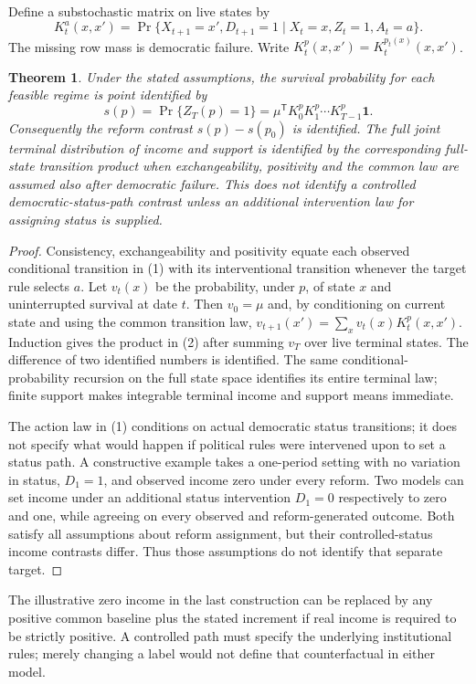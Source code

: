 \documentclass[11pt]{article}
\newtheorem{theorem}{Theorem}
\begin{document}
Define a substochastic matrix on live states by
\[
 K_t^a(x,x')=\Pr\{X_{t+1}=x',D_{t+1}=1\mid
                   X_t=x,Z_t=1,A_t=a\}.                     \tag{1}
\]
The missing row mass is democratic failure. Write
$K_t^p(x,x')=K_t^{p_t(x)}(x,x')$.
\begin{theorem}\label{identification}
Under the stated assumptions, the survival probability for each feasible
regime is point identified by
\[
 s(p)=\Pr\{Z_T(p)=1\}
       =\mu^{\mathsf T}K_0^pK_1^p\cdots K_{T-1}^p\boldsymbol{1}.
                                                                    \tag{2}
\]
Consequently the reform contrast $s(p)-s(p_0)$ is identified. The full
joint terminal distribution of income and support is identified by the
corresponding full-state transition product when exchangeability,
positivity and the common law are assumed also after democratic failure.
This does not identify a controlled democratic-status-path contrast unless
an additional intervention law for assigning status is supplied.
\end{theorem}
\begin{proof}
Consistency, exchangeability and positivity equate each observed
conditional transition in (1) with its interventional transition whenever
the target rule selects $a$. Let $v_t(x)$ be the probability, under $p$,
of state $x$ and uninterrupted survival at date $t$. Then $v_0=\mu$ and,
by conditioning on current state and using the common transition law,
$v_{t+1}(x')=\sum_xv_t(x)K_t^p(x,x')$. Induction gives the product in
(2) after summing $v_T$ over live terminal states. The difference of two
identified numbers is identified. The same conditional-probability
recursion on the full state space identifies its entire terminal law;
finite support makes integrable terminal income and support means immediate.

The action law in (1) conditions on actual democratic status transitions;
it does not specify what would happen if political rules were intervened
upon to set a status path. A constructive example takes a one-period
setting with no variation in status, $D_1=1$, and observed income zero
under every reform. Two models can set income under an additional status
intervention $D_1=0$ respectively to zero and one, while agreeing on every
observed and reform-generated outcome. Both satisfy all assumptions
about reform assignment, but their controlled-status income contrasts
differ. Thus those assumptions do not identify that separate target.
\end{proof}
The illustrative zero income in the last construction can be replaced by
any positive common baseline plus the stated increment if real income is
required to be strictly positive. A controlled path must specify the
underlying institutional rules; merely changing a label would not define
that counterfactual in either model.
\end{document}
